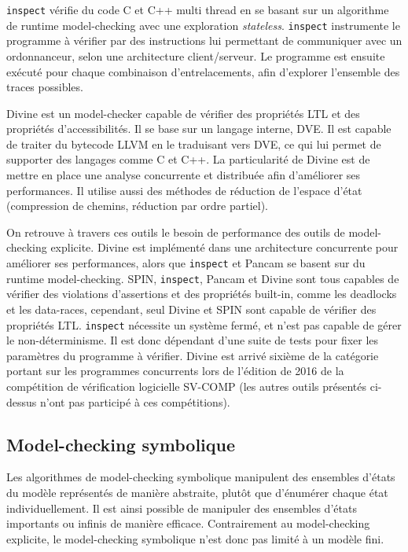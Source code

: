\texttt{inspect}\cite{inspect} vérifie du code C et C++
multi thread en se basant sur un algorithme de runtime model-checking
avec une exploration \emph{stateless}. \texttt{inspect} instrumente
le programme à vérifier par des instructions lui permettant de
communiquer avec un ordonnanceur, selon une architecture client/serveur.
Le programme est ensuite exécuté pour chaque combinaison d'entrelacements,
afin d'explorer l'ensemble des traces possibles.

Divine\cite{Divine_3_0} est un model-checker capable de vérifier des
propriétés \ac{LTL} et des propriétés d'accessibilités. Il se base sur un
langage interne, DVE. Il est capable de traiter du bytecode LLVM en le
traduisant vers DVE, ce qui lui permet de supporter des langages comme C
et C++. La particularité de Divine est de mettre en place une analyse
concurrente et distribuée afin d'améliorer ses performances. Il utilise
aussi des méthodes de réduction de l'espace d'état (compression de
chemins, réduction par ordre partiel).

On retrouve à travers ces outils le besoin de performance des outils de
model-checking explicite. Divine est implémenté dans une architecture
concurrente pour améliorer ses performances, alors que \texttt{inspect} et
Pancam se basent sur du runtime model-checking. SPIN, \texttt{inspect}, Pancam
et Divine sont tous capables de vérifier des violations d'assertions et des
propriétés built-in, comme les deadlocks et les data-races, cependant, seul
Divine et SPIN sont capable de vérifier des propriétés \ac{LTL}.
\texttt{inspect} nécessite un système fermé, et n'est pas capable de gérer le
non-déterminisme. Il est donc dépendant d'une suite de tests pour fixer les
paramètres du programme à vérifier. Divine est arrivé sixième de la catégorie
portant sur les programmes concurrents lors de l'édition de 2016 de la
compétition de vérification logicielle SV-COMP\citep{svcomp_2016_result} (les
autres outils présentés ci-dessus n'ont pas participé à ces compétitions).

\subsection{Model-checking symbolique}

Les algorithmes de model-checking symbolique manipulent des ensembles d'états
du modèle représentés de manière abstraite, plutôt que d'énumérer chaque état
individuellement. Il est ainsi possible de manipuler des ensembles
d'états importants ou infinis de manière efficace. Contrairement au
model-checking explicite, le model-checking symbolique n'est donc pas limité à
un modèle fini.

